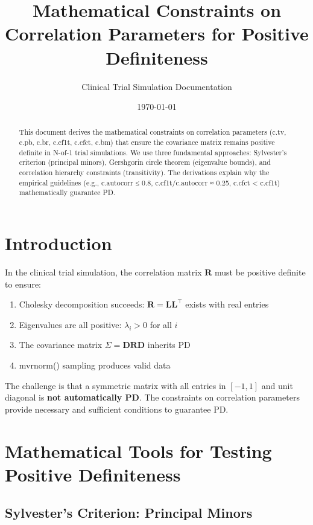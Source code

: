 \documentclass[12pt,a4paper]{article}
\title{Mathematical Constraints on Correlation Parameters for Positive Definiteness}
\author{Clinical Trial Simulation Documentation}
\date{\today}
\theoremstyle{definition}
\begin{document}
\maketitle

\begin{abstract}
This document derives the mathematical constraints on correlation parameters (c.tv, c.pb, c.br, c.cf1t, c.cfct, c.bm) that ensure the covariance matrix remains positive definite in N-of-1 trial simulations. We use three fundamental approaches: Sylvester's criterion (principal minors), Gershgorin circle theorem (eigenvalue bounds), and correlation hierarchy constraints (transitivity). The derivations explain why the empirical guidelines (e.g., c.autocorr ≤ 0.8, c.cf1t/c.autocorr ≈ 0.25, c.cfct < c.cf1t) mathematically guarantee PD.
\end{abstract}

\newpage
\tableofcontents
\newpage

\section{Introduction}

In the clinical trial simulation, the correlation matrix $\mathbf{R}$ must be positive definite to ensure:
\begin{enumerate}
  \item Cholesky decomposition succeeds: $\mathbf{R} = \mathbf{L} \mathbf{L}^\top$ exists with real entries
  \item Eigenvalues are all positive: $\lambda_i > 0$ for all $i$
  \item The covariance matrix $\Sigma = \mathbf{D} \mathbf{R} \mathbf{D}$ inherits PD
  \item mvrnorm() sampling produces valid data
\end{enumerate}

The challenge is that a symmetric matrix with all entries in $[-1,1]$ and unit diagonal is \textbf{not automatically PD}. The constraints on correlation parameters provide necessary and sufficient conditions to guarantee PD.

\section{Mathematical Tools for Testing Positive Definiteness}

\subsection{Sylvester's Criterion: Principal Minors}
\end{document}
